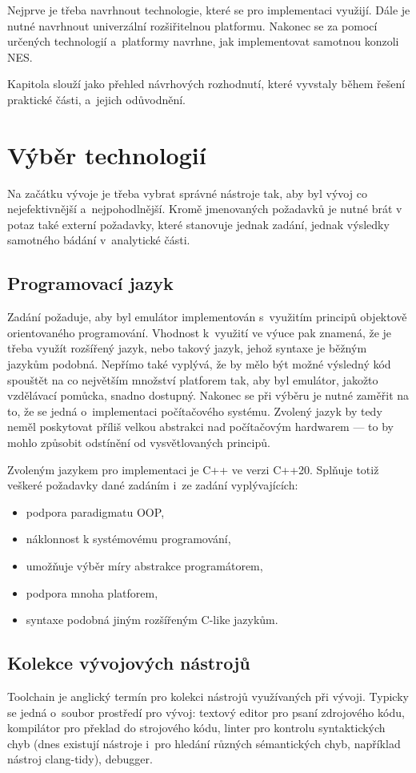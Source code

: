 Nejprve je třeba navrhnout technologie, které se pro implementaci využijí. Dále je nutné navrhnout univerzální rozšiřitelnou platformu. Nakonec se za pomocí určených technologií a~platformy navrhne, jak implementovat samotnou konzoli NES.

Kapitola slouží jako přehled návrhových rozhodnutí, které vyvstaly během řešení praktické části, a~jejich odůvodnění.

\section{Výběr technologií}
Na začátku vývoje je třeba vybrat správné nástroje tak, aby byl vývoj co nejefektivnější a~nejpohodlnější. Kromě jmenovaných požadavků je nutné brát v potaz také externí požadavky, které stanovuje jednak zadání, jednak výsledky samotného bádání v~analytické části.

\subsection{Programovací jazyk}
Zadání požaduje, aby byl emulátor implementován s~využitím principů objektově orientovaného programování. Vhodnost k~využití ve výuce pak znamená, že je třeba využít rozšířený jazyk, nebo takový jazyk, jehož syntaxe je běžným jazykům podobná. Nepřímo také vyplývá, že by mělo být možné výsledný kód spouštět na co největším množství platforem tak, aby byl emulátor, jakožto vzdělávací pomůcka, snadno dostupný. Nakonec se při výběru je nutné zaměřit na to, že se jedná o~implementaci počítačového systému. Zvolený jazyk by tedy neměl poskytovat příliš velkou abstrakci nad počítačovým hardwarem --- to by mohlo způsobit odstínění od vysvětlovaných principů.

Zvoleným jazykem pro implementaci je C++ ve verzi C++20. Splňuje totiž veškeré požadavky dané zadáním i~ze zadání vyplývajících:
\begin{itemize}
	\item podpora paradigmatu OOP,
	\item náklonnost k systémovému programování,
	\item umožňuje výběr míry abstrakce programátorem,
	\item podpora mnoha platforem,
	\item syntaxe podobná jiným rozšířeným C-like jazykům.
\end{itemize}

\subsection{Kolekce vývojových nástrojů}
\begin{definition}[Toolchain]
	Toolchain je anglický termín pro kolekci nástrojů využívaných při vývoji. Typicky se jedná o~soubor prostředí pro vývoj: textový editor pro psaní zdrojového kódu, kompilátor pro překlad do strojového kódu, linter pro kontrolu syntaktických chyb (dnes existují nástroje i~pro hledání různých sémantických chyb, například nástroj clang-tidy), debugger.
\end{definition}

